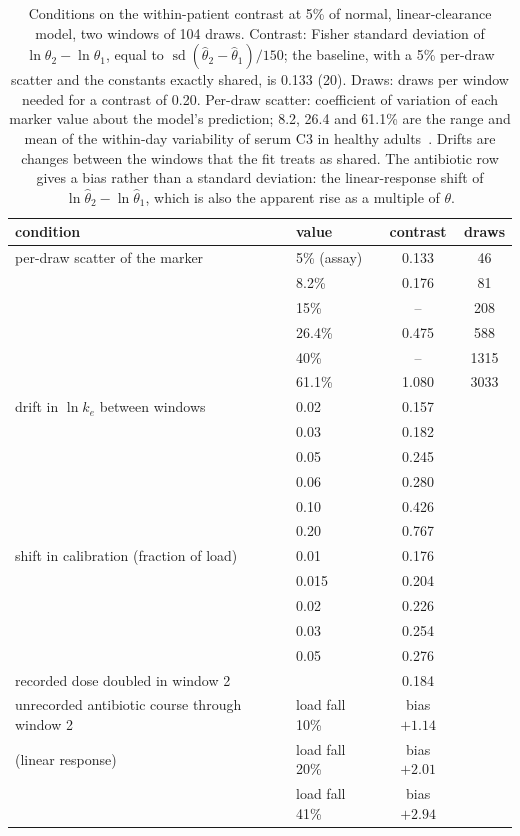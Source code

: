 \begin{table}[htbp]
\centering\small\setlength{\tabcolsep}{5pt}
\caption{\label{stab:s5conditions}Conditions on the within-patient contrast at 5\% of normal,
linear-clearance model, two windows of 104 draws. Contrast: Fisher standard deviation of
$\ln\theta_2-\ln\theta_1$, equal to $\operatorname{sd}(\hat\theta_2-\hat\theta_1)/150$; the
baseline, with a 5\% per-draw scatter and the constants exactly shared, is 0.133 (20\um). Draws:
draws per window needed for a contrast of 0.20. Per-draw scatter: coefficient of variation of each
marker value about the model's prediction; 8.2, 26.4 and 61.1\% are the range and mean of the
within-day variability of serum C3 in healthy adults~\cite{thompson2012c3}. Drifts are changes
between the windows that the fit treats as shared. The antibiotic row gives a bias rather than a
standard deviation: the linear-response shift of $\ln\hat\theta_2-\ln\hat\theta_1$, which is also the
apparent rise as a multiple of $\theta$.}
\begin{tabular}{@{}llcc@{}}
\toprule
condition & value & contrast & draws \\
\midrule
per-draw scatter of the marker & 5\% (assay) & 0.133 & 46 \\
& 8.2\% & 0.176 & 81 \\
& 15\% & -- & 208 \\
& 26.4\% & 0.475 & 588 \\
& 40\% & -- & 1315 \\
& 61.1\% & 1.080 & 3033 \\
\addlinespace
drift in $\ln k_e$ between windows & 0.02 & 0.157 & \\
& 0.03 & 0.182 & \\
& 0.05 & 0.245 & \\
& 0.06 & 0.280 & \\
& 0.10 & 0.426 & \\
& 0.20 & 0.767 & \\
\addlinespace
shift in calibration (fraction of load) & 0.01 & 0.176 & \\
& 0.015 & 0.204 & \\
& 0.02 & 0.226 & \\
& 0.03 & 0.254 & \\
& 0.05 & 0.276 & \\
\addlinespace
recorded dose doubled in window 2 & & 0.184 & \\
\addlinespace
unrecorded antibiotic course through window 2 & load fall 10\% & bias $+1.14$ & \\
(linear response) & load fall 20\% & bias $+2.01$ & \\
& load fall 41\% & bias $+2.94$ & \\
\bottomrule
\end{tabular}
\end{table}

